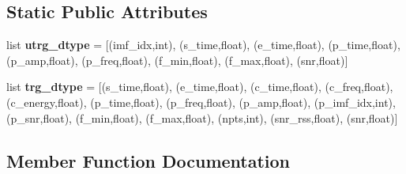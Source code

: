 \subsection*{Static Public Attributes}
\begin{DoxyCompactItemize}
\item 
list {\bfseries utrg\+\_\+dtype} = \mbox{[}(\textquotesingle{}imf\+\_\+idx\textquotesingle{},int), (\textquotesingle{}s\+\_\+time\textquotesingle{},float), (\textquotesingle{}e\+\_\+time\textquotesingle{},float), (\textquotesingle{}p\+\_\+time\textquotesingle{},float), (\textquotesingle{}p\+\_\+amp\textquotesingle{},float), (\textquotesingle{}p\+\_\+freq\textquotesingle{},float), (\textquotesingle{}f\+\_\+min\textquotesingle{},float), (\textquotesingle{}f\+\_\+max\textquotesingle{},float), (\textquotesingle{}snr\textquotesingle{},float)\mbox{]}\hypertarget{classpython_1_1__wrap_1_1etagen_abd7912f308ef9623da9dfcea0e8a1c95}{}\label{classpython_1_1__wrap_1_1etagen_abd7912f308ef9623da9dfcea0e8a1c95}

\item 
list {\bfseries trg\+\_\+dtype} = \mbox{[}(\textquotesingle{}s\+\_\+time\textquotesingle{},float), (\textquotesingle{}e\+\_\+time\textquotesingle{},float), (\textquotesingle{}c\+\_\+time\textquotesingle{},float), (\textquotesingle{}c\+\_\+freq\textquotesingle{},float), (\textquotesingle{}c\+\_\+energy\textquotesingle{},float), (\textquotesingle{}p\+\_\+time\textquotesingle{},float), (\textquotesingle{}p\+\_\+freq\textquotesingle{},float), (\textquotesingle{}p\+\_\+amp\textquotesingle{},float), (\textquotesingle{}p\+\_\+imf\+\_\+idx\textquotesingle{},int), (\textquotesingle{}p\+\_\+snr\textquotesingle{},float), (\textquotesingle{}f\+\_\+min\textquotesingle{},float), (\textquotesingle{}f\+\_\+max\textquotesingle{},float), (\textquotesingle{}npts\textquotesingle{},int), (\textquotesingle{}snr\+\_\+rss\textquotesingle{},float), (\textquotesingle{}snr\textquotesingle{},float)\mbox{]}\hypertarget{classpython_1_1__wrap_1_1etagen_a9e04218bd2d74e12cc0a91f5f8fd0bc1}{}\label{classpython_1_1__wrap_1_1etagen_a9e04218bd2d74e12cc0a91f5f8fd0bc1}

\end{DoxyCompactItemize}


\subsection{Member Function Documentation}
